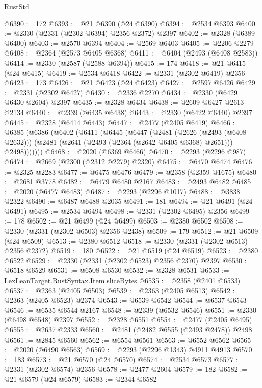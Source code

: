 \begin{lexlean}{RustStd}
\begin{coremodule}
@6390 := 172
@6393 := @21 @6390 (@24 @6390)
@6394 := @2534 @6393
@6400 := @2330 (@2331 (@2302 @6394) @2356 @2372) @2397
@6402 := @2328 (@6389 @6400)
@6403 := @2570 @6394
@6404 := @2569 @6403
@6405 := @2206 @2279
@6408 := @2364 (@2573 @6405 @6368)
@6411 := @6404 (@2493 (@6408 @2583))
@6414 := @2330 (@2587 (@2588 @6394))
@6415 := 174
@6418 := @21 @6415 (@24 @6415)
@6419 := @2534 @6418
@6422 := @2331 (@2302 @6419) @2356
@6423 := 173
@6426 := @21 @6423 (@24 @6423)
@6427 := @2597 @6426
@6429 := @2331 (@2302 @6427)
@6430 := @2336 @2270
@6434 := @2330 (@6429 @6430 @2604) @2397
@6435 := @2328 @6434
@6438 := @2609 @6427 @2613 @2134
@6440 := @2339 (@6435 @6438)
@6443 := @2330 (@6422 @6440) @2397
@6445 := @2328 (@6414 @6443)
@6447 := @2477 (@2405 @6419)
@6466 := @6385
    (@6386
      (@6402
        (@6411
          (@6445
            (@6447
              (@2481
                (@2626 (@2493 (@6408 @2632)))
                (@2481 (@2641 (@2493 (@2364 (@2642 @6405 @6368) @2651))) @2498)))))))
@6468 := @2020 (@6369 @6466)
@6470 := @2293 (@2296 @987)
@6474 := @2669 (@2300 (@2312 @2279) @2320)
@6475 := @6470 @6474
@6476 := @2325 @2283
@6477 := @6475 @6476
@6479 := @2358 (@2359 @1675)
@6480 := @2681 @3778
@6482 := @6479 @6480 @2167
@6483 := @2493 @6482
@6485 := @2020 (@6477 @6483)
@6487 := @2293 (@2296 @1017)
@6488 := @3838 @2322
@6490 := @6487 @6488 @2035
@6491 := 181
@6494 := @21 @6491 (@24 @6491)
@6495 := @2534 @6494
@6498 := @2331 (@2302 @6495) @2356
@6499 := 178
@6502 := @21 @6499 (@24 @6499)
@6503 := @2380 @6502
@6508 := @2330 (@2331 (@2302 @6503) @2356 @2438)
@6509 := 179
@6512 := @21 @6509 (@24 @6509)
@6513 := @2380 @6512
@6518 := @2330 (@2331 (@2302 @6513) @2356 @2372)
@6519 := 180
@6522 := @21 @6519 (@24 @6519)
@6523 := @2380 @6522
@6529 := @2330 (@2331 (@2302 @6523) @2356 @2370) @2397
@6530 := @6518 @6529
@6531 := @6508 @6530
@6532 := @2328 @6531
@6533 := LexLeanTarget.RustSyntax.Item.sliceBytes
@6535 := @2358 (@2401 @6533)
@6537 := @2363 (@2405 @6503)
@6539 := @2363 (@2405 @6513)
@6542 := @2363 (@2405 @6523) @2374
@6543 := @6539 @6542
@6544 := @6537 @6543
@6546 := @6535 @6544 @2167
@6548 := @2339 (@6532 @6546)
@6551 := @2330 (@6498 @6548) @2397
@6552 := @2328 @6551
@6554 := @2477 (@2405 @6495)
@6555 := @2637 @2333
@6560 := @2481 (@2482 @6555 (@2493 @2478)) @2498
@6561 := @2845 @6560
@6562 := @6554 @6561
@6563 := @6552 @6562
@6565 := @2020 (@6490 @6563)
@6569 := @2293 (@2296 @1343) @4911 @4913
@6570 := 183
@6573 := @21 @6570 (@24 @6570)
@6574 := @2534 @6573
@6577 := @2331 (@2302 @6574) @2356
@6578 := @2477 @2604
@6579 := 182
@6582 := @21 @6579 (@24 @6579)
@6583 := @2344 @6582

\end{coremodule}
\end{lexlean}
